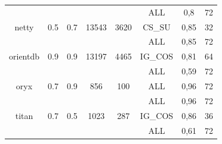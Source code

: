 \begin{table}[H]
\begin{center}
{\begin{tabular}{cccccccc}
                               &            &               &                  &                    & ALL                      & 0,8        & 72                            \\
netty                          & 0.5        & 0.7           & 13543            & 3620               & CS\_SU                   & 0,85       & 32                            \\
                               &            &               &                  &                    & ALL                      & 0,85       & 72                            \\
orientdb                       & 0.9        & 0.9           & 13197            & 4465               & IG\_COS                  & 0,81       & 64                            \\
                               &            &               &                  &                    & ALL                      & 0,59       & 72                            \\
oryx                           & 0.7        & 0.9           & 856              & 100                & ALL                      & 0,96       & 72                            \\
                               &            &               &                  &                    & ALL                      & 0,96       & 72                            \\
titan                          & 0.7        & 0.5           & 1023             & 287                & IG\_COS                  & 0,86       & 36                            \\
                               &            &               &                  &                    & ALL                      & 0,61       & 72                           
\end{tabular}
}
\end{center}
\end{table}
